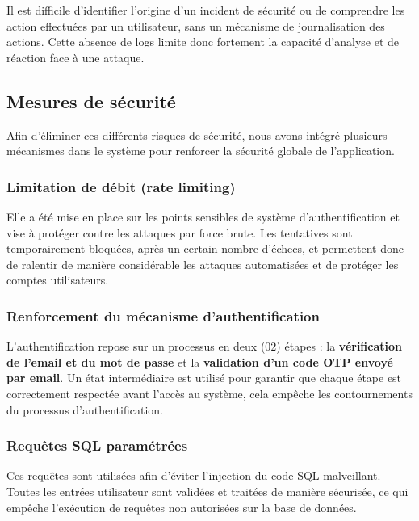 \documentclass[a4paper,12pt]{report}
\begin{document}
    Il est difficile d'identifier l'origine d'un incident de sécurité ou de comprendre les action effectuées par un utilisateur, sans un mécanisme de journalisation des actions. Cette absence de logs limite donc fortement la capacité d'analyse et de réaction face à une attaque.
    
    \subsection{Mesures de sécurité}
    
    Afin d'éliminer ces différents risques de sécurité, nous avons intégré plusieurs mécanismes dans le système pour renforcer la sécurité globale de l'application.
    
    \subsubsection{Limitation de débit (rate limiting)}
    
    Elle a été mise en place sur les points sensibles de système d'authentification et vise à protéger contre les attaques par force brute. Les tentatives sont temporairement bloquées, après un certain nombre d'échecs, et permettent donc de ralentir de manière considérable les attaques automatisées et de protéger les comptes utilisateurs.
    
    \subsubsection{Renforcement du mécanisme d'authentification}
    
    L'authentification repose sur un processus en deux (02) étapes : la \textbf{vérification de l'email et du mot de passe} et la \textbf{validation d'un code OTP envoyé par email}. Un état intermédiaire est utilisé pour garantir que chaque étape est correctement respectée avant l'accès au système, cela empêche les contournements du processus d'authentification.    
    
    \subsubsection{Requêtes SQL paramétrées}
    
    Ces requêtes sont utilisées afin d'éviter l'injection du code SQL malveillant. Toutes les entrées utilisateur sont validées et traitées de manière sécurisée, ce qui empêche l'exécution de requêtes non autorisées sur la base de données.
    
\end{document}
